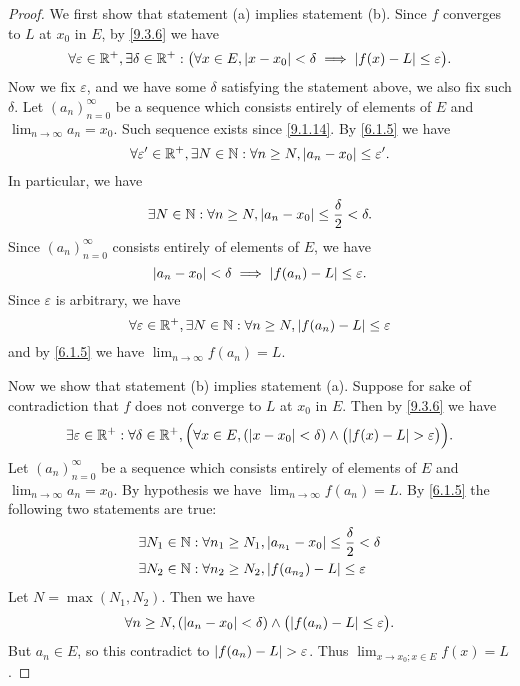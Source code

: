 \begin{proof}
  We first show that statement (a) implies statement (b).
  Since \(f\) converges to \(L\) at \(x_0\) in \(E\), by \cref{9.3.6} we have
  \[
    \forall \varepsilon \in \mathbb{R}^+, \exists \delta \in \mathbb{R}^+ : \big(\forall x \in E, \left\lvert x - x_0\right\rvert < \delta \implies \left\lvert f(x) - L\right\rvert \leq \varepsilon\big).
  \]
  Now we fix \(\varepsilon\), and we have some \(\delta\) satisfying the statement above, we also fix such \(\delta\).
  Let \((a_n)_{n = 0}^\infty\) be a sequence which consists entirely of elements of \(E\) and \(\lim_{n \to \infty} a_n = x_0\).
  Such sequence exists since \cref{9.1.14}.
  By \cref{6.1.5} we have
  \[
    \forall \varepsilon' \in \mathbb{R}^+, \exists N \in \mathbb{N} : \forall n \geq N, \left\lvert a_n - x_0\right\rvert \leq \varepsilon'.
  \]
  In particular, we have
  \[
    \exists N \in \mathbb{N} : \forall n \geq N, \left\lvert a_n - x_0\right\rvert \leq \dfrac{\delta}{2} < \delta.
  \]
  Since \((a_n)_{n = 0}^\infty\) consists entirely of elements of \(E\), we have
  \[
    \left\lvert a_n - x_0\right\rvert < \delta \implies \left\lvert f(a_n) - L\right\rvert \leq \varepsilon.
  \]
  Since \(\varepsilon\) is arbitrary, we have
  \[
    \forall \varepsilon \in \mathbb{R}^+, \exists N \in \mathbb{N} : \forall n \geq N, \left\lvert f(a_n) - L\right\rvert \leq \varepsilon
  \]
  and by \cref{6.1.5} we have \(\lim_{n \to \infty} f(a_n) = L\).

  Now we show that statement (b) implies statement (a).
  Suppose for sake of contradiction that \(f\) does not converge to \(L\) at \(x_0\) in \(E\).
  Then by \cref{9.3.6} we have
  \[
    \exists \varepsilon \in \R^+ : \forall \delta \in \R^+, \Big(\forall x \in E, (\abs{x - x_0} < \delta) \land \big(\abs{f(x) - L} > \varepsilon\big)\Big).
  \]
  Let \((a_n)_{n = 0}^\infty\) be a sequence which consists entirely of elements of \(E\) and \(\lim_{n \to \infty} a_n = x_0\).
  By hypothesis we have \(\lim_{n \to \infty} f(a_n) = L\).
  By \cref{6.1.5} the following two statements are true:
  \begin{align*}
     & \exists N_1 \in \mathbb{N} : \forall n_1 \geq N_1, \left\lvert a_{n_1} - x_0\right\rvert \leq \dfrac{\delta}{2} < \delta \\
     & \exists N_2 \in \mathbb{N} : \forall n_2 \geq N_2, \left\lvert f(a_{n_2}) - L\right\rvert \leq \varepsilon
  \end{align*}
  Let \(N = \max(N_1, N_2)\).
  Then we have
  \[
    \forall n \geq N, (\abs{a_n - x_0} < \delta) \land \big(\abs{f(a_n) - L} \leq \varepsilon\big).
  \]
  But \(a_n \in E\), so this contradict to \(\left\lvert f(a_n) - L\right\rvert > \varepsilon\).
  Thus \(\lim_{x \to x_0 ; x \in E} f(x) = L\).
\end{proof}

